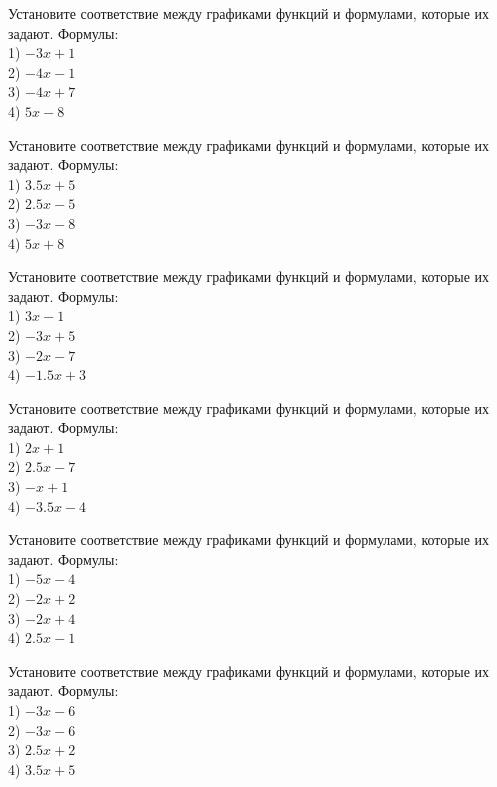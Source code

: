 \documentclass[4apaper]{article}
\begin{document}
\begin{taskBN}{1}
Установите соответствие между графиками функций и формулами, которые их задают. Формулы: \\1) $-3x+1$\\2) $-4x-1$\\3) $-4x+7$\\4) $5x-8$
\end{taskBN}

\begin{taskBN}{2}
Установите соответствие между графиками функций и формулами, которые их задают. Формулы: \\1) $3.5x+5$\\2) $2.5x-5$\\3) $-3x-8$\\4) $5x+8$
\end{taskBN}

\begin{taskBN}{3}
Установите соответствие между графиками функций и формулами, которые их задают. Формулы: \\1) $3x-1$\\2) $-3x+5$\\3) $-2x-7$\\4) $-1.5x+3$
\end{taskBN}

\begin{taskBN}{4}
Установите соответствие между графиками функций и формулами, которые их задают. Формулы: \\1) $2x+1$\\2) $2.5x-7$\\3) $-x+1$\\4) $-3.5x-4$
\end{taskBN}

\begin{taskBN}{5}
Установите соответствие между графиками функций и формулами, которые их задают. Формулы: \\1) $-5x-4$\\2) $-2x+2$\\3) $-2x+4$\\4) $2.5x-1$
\end{taskBN}

\begin{taskBN}{6}
Установите соответствие между графиками функций и формулами, которые их задают. Формулы: \\1) $-3x-6$\\2) $-3x-6$\\3) $2.5x+2$\\4) $3.5x+5$
\end{taskBN}
\end{document}
